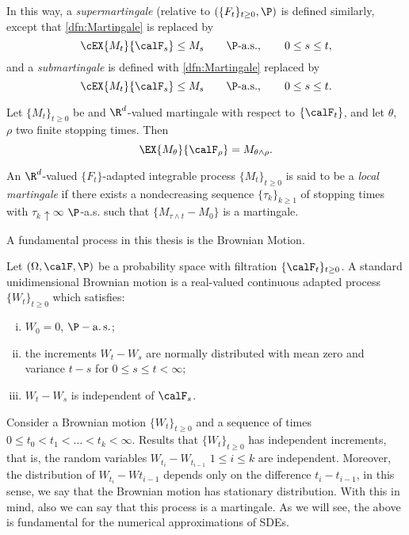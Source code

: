 	In this way, a \emph{supermartingale} (relative to $\left(\{F_t \}_{t\geq 0}, \P \right)$ is defined similarly, 
except that \eqref{dfn:Martingale} is replaced by
$$
	\cEX{M_t}{\calF_s}\leq M_s
	\qquad \P\text{-a.s.},
	\qquad 0\leq s \leq t, 
$$ and a \emph{submartingale} is defined with \eqref{dfn:Martingale} 
replaced by
$$
	\cEX{M_t}{\calF_s} \leq M_s
	\qquad \P\text{-a.s.},
	\qquad 0\leq s \leq t.
$$ 
\begin{thm}
	Let $\{M_t\}_{t\geq 0}$ be and $\R^d$-valued martingale with respect to $\{\calF_t\}$, and let $\theta$, $\rho$ two 
	finite stopping times. Then 
	$$
		\EX{M_{\theta}}{\calF_{\rho}}= M_{\theta \wedge\rho}.
	$$
\end{thm}
\begin{definition}
	An $\R^d$-valued $\{F_t\}$-adapted integrable process $\{M_t\}_{t\geq 0}$ is said to be a \emph{local martingale}
	if there exists a nondecreasing sequence $\{\tau_k\}_{k\geq 1}$ of stopping times with $\tau_k \uparrow \infty$
	$\P$-a.s. such that $\{M_{\tau\wedge t} - M_0 \}$ is a martingale.
\end{definition}
A fundamental process in this thesis is the Brownian Motion.
\begin{definition}
	Let $(\Omega, \calF, \P)$ be a probability space with filtration $\{\calF_t\}_{t\geq 0}$. A standard unidimensional
	Brownian motion is a real-valued continuous adapted process $\{W_t\}_{t\geq 0}$ which satisfies:
	\begin{enumerate}[(i)]
		\item 
			$W_0=0$, \qquad $\P-\as$;
		\item 
			the increments $W_t-W_s$ are normally distributed with mean zero and variance $t-s$ for 
			$0\leq s\leq t<\infty$;
		\item
			$W_t-W_s$ is independent of $\calF_s$.
	\end{enumerate}
\end{definition}

	Consider a Brownian motion $\{W_t\}_{t\geq 0}$  and a sequence of times $0 \leq t_0 < t_1 < \ldots < t_k < \infty$.
Results that $\{W_t\}_{t\geq 0}$ has independent increments, that is, the random variables $W_{t_i}-W_{t_{i-1}}$ 
$1\leq i \leq k $ are independent. Moreover, the distribution of $W_{t_i} - W{t_{i-1}}$ depends only on the 
difference $t_i - t_{i-1}$, in this sense, we say that the Brownian motion has stationary distribution. With this in
mind, also we can say that this process is a martingale. As we will see, the above is fundamental for the numerical 
approximations of SDEs.
%
